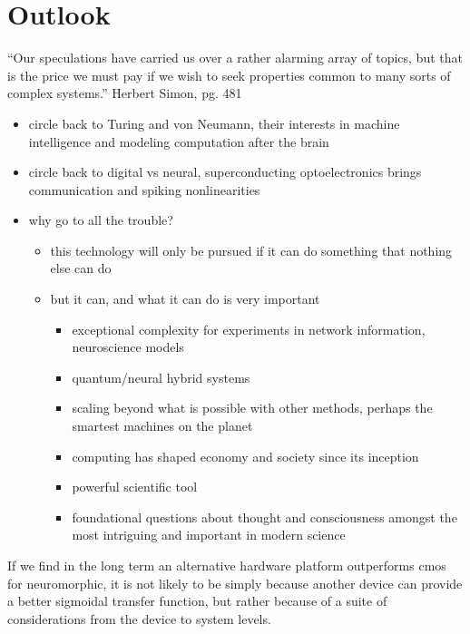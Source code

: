\section{\label{sec:outlook}Outlook}

``Our speculations have carried us over a rather alarming array of topics, but that is the price we must pay if we wish to seek properties common to many sorts of complex systems.'' Herbert Simon, \cite{si1962} pg. 481


\begin{itemize}

\item circle back to Turing and von Neumann, their interests in machine intelligence and modeling computation after the brain
\item circle back to digital vs neural, superconducting optoelectronics brings communication and spiking nonlinearities

\item why go to all the trouble?
\begin{itemize}
\item this technology will only be pursued if it can do something that nothing else can do
\item but it can, and what it can do is very important
\begin{itemize}
\item exceptional complexity for experiments in network information, neuroscience models
\item quantum/neural hybrid systems
\item scaling beyond what is possible with other methods, perhaps the smartest machines on the planet
\item computing has shaped economy and society since its inception
\item powerful scientific tool
\item foundational questions about thought and consciousness amongst the most intriguing and important in modern science
\end{itemize}

\end{itemize}

\end{itemize}

\vspace{3em}
If we find in the long term an alternative hardware platform outperforms cmos for neuromorphic, it is not likely to be simply because another device can provide a better sigmoidal transfer function, but rather because of a suite of considerations from the device to system levels.

